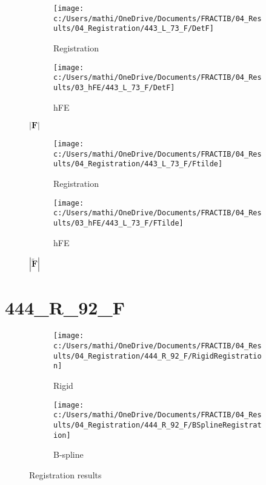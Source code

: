 \documentclass{article}%
\begin{document}
%


\begin{figure}[h!]%
\begin{subfigure}[b]{0.5\linewidth}%
\texttt{[image: c:/Users/mathi/OneDrive/Documents/FRACTIB/04\_Results/04\_Registration/443\_L\_73\_F/DetF]}%
\caption{Registration}%
\end{subfigure}%
\begin{subfigure}[b]{0.5\linewidth}%
\texttt{[image: c:/Users/mathi/OneDrive/Documents/FRACTIB/04\_Results/03\_hFE/443\_L\_73\_F/DetF]}%
\caption{hFE}%
\end{subfigure}%
\caption{$|\mathbf{F}|$}%
\end{figure}

%


\begin{figure}[h!]%
\begin{subfigure}[b]{0.5\linewidth}%
\texttt{[image: c:/Users/mathi/OneDrive/Documents/FRACTIB/04\_Results/04\_Registration/443\_L\_73\_F/Ftilde]}%
\caption{Registration}%
\end{subfigure}%
\begin{subfigure}[b]{0.5\linewidth}%
\texttt{[image: c:/Users/mathi/OneDrive/Documents/FRACTIB/04\_Results/03\_hFE/443\_L\_73\_F/FTilde]}%
\caption{hFE}%
\end{subfigure}%
\caption{$|\widetilde{\mathbf{F}}|$}%
\end{figure}

%
\newpage%
\section*{444\_R\_92\_F}%
\label{sec:444R92F}%


\begin{figure}[h!]%
\begin{subfigure}[b]{0.5\linewidth}%
\texttt{[image: c:/Users/mathi/OneDrive/Documents/FRACTIB/04\_Results/04\_Registration/444\_R\_92\_F/RigidRegistration]}%
\caption{Rigid}%
\end{subfigure}%
\begin{subfigure}[b]{0.5\linewidth}%
\texttt{[image: c:/Users/mathi/OneDrive/Documents/FRACTIB/04\_Results/04\_Registration/444\_R\_92\_F/BSplineRegistration]}%
\caption{B{-}spline}%
\end{subfigure}%
\caption{Registration results}%
\end{figure}

%
\end{document}
